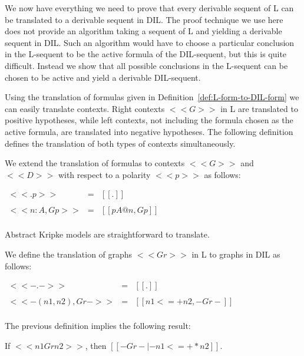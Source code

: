 We now have everything we need to prove that every derivable sequent
of L can be translated to a derivable sequent in DIL. The proof
technique we use here does not provide an algorithm taking a sequent
of L and yielding a derivable sequent in DIL.  Such an algorithm would
have to choose a particular conclusion in the L-sequent to be the
active formula of the DIL-sequent, but this is quite difficult.
Instead we show that all possible conclusions in the L-sequent can be
chosen to be active and yield a derivable DIL-sequent.

Using the translation of formulas given in
Definition~\ref{def:L-form-to-DIL-form} we can easily translate
contexts.  Right contexts $<<G>>$ in L are translated to positive
hypotheses, while left contexts, not including the formula chosen as
the active formula, are translated into negative hypotheses.  The
following definition defines the translation of both types of contexts
simultaneously.
\begin{definition}
  \label{def:trans-L-ctx-to-DIL-ctx}
  We extend the translation of formulas to contexts $<<G>>$ and
  $<<D>>$ with respect to a polarity $<<p>>$ as follows:
  \begin{center}
    \begin{math}
      \begin{array}{lll}
        <<{ . } p>> & = & [[.]]\\
        & \\
        <<{ n : A , G } p>> & = & [[p{A}@n,{G}p]]\\
      \end{array}
    \end{math}
  \end{center}
\end{definition}
Abstract Kripke models are straightforward to translate.
\begin{definition}
  \label{def:trans-L-ctx-to-DIL-ctx}
  We define the translation of graphs $<<Gr>>$ in L to graphs in DIL
  as follows:
  \begin{center}
    \begin{math}
      \begin{array}{lll}
        <<- . ->> & = & [[.]]\\
        & \\
        <<- (n1 , n2) , Gr ->> & = & [[n1 <=+ n2, -Gr-]]\\
      \end{array}
    \end{math}
  \end{center}
\end{definition}
\noindent
The previous definition implies the following result:
\begin{lemma}[Reachability]
  \label{lemma:reach}
  If $<<n1 Gr n2>>$, then $[[-Gr- |- n1 <=+* n2]]$.
\end{lemma}

